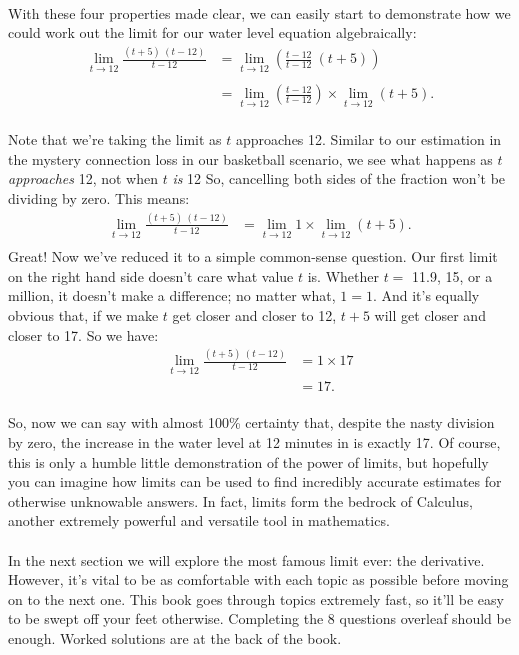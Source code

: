 \documentclass[11pt, leqno]{article}
\numberwithin{equation}{section}
\begin{document}
\\ With these four properties made clear, we can easily start to demonstrate how we could work out the limit for our water level equation algebraically:
\begin{align*}
	\lim_{t \to 12} \frac{(t + 5) \ (t - 12)}{t - 12} &= \lim_{t \to 12} \left( \frac{t - 12}{t - 12} \ (t + 5) \right) \\ \\
	&= \lim_{t \to 12} \left(\frac{t - 12}{t - 12}\right) \times \lim_{t \to 12} (t + 5).
\end{align*}
\\ Note that we're taking the limit as \(t\) approaches 12. Similar to our estimation in the mystery connection loss in our basketball scenario, we see what happens as \(t\) \textit{approaches} 12, not when \(t\) \textit{is} 12 So, cancelling both sides of the fraction won't be dividing by zero. This means:
\begin{align*}
\lim_{t \to 12} \frac{(t + 5) \ (t - 12)}{t - 12} &= \lim_{t \to 12} 1 \times \lim_{t \to 12} \left( t + 5 \right). \\
\end{align*}
Great! Now we've reduced it to a simple common-sense question. Our first limit on the right hand side doesn't care what value \(t\) is. Whether \(t = \) 11.9, 15, or a million, it doesn't make a difference; no matter what, \(1 = 1\). And it's equally obvious that, if we make \(t\) get closer and closer to 12, \(t + 5\) will get closer and closer to 17. So we have:
\begin{align*}
\lim_{t \to 12} \frac{(t + 5) \ (t - 12)}{t - 12} &= 1 \times 17 \\
&= 17.
\end{align*}
\\ So, now we can say with almost 100\% certainty that, despite the nasty division by zero, the increase in the water level at 12 minutes in is exactly 17. Of course, this is only a humble little demonstration of the power of limits, but hopefully you can imagine how limits can be used to find incredibly accurate estimates for otherwise unknowable answers. In fact, limits form the bedrock of Calculus, another extremely powerful and versatile tool in mathematics. 
\\ \\ In the next section we will explore the most famous limit ever: the derivative. However, it's vital to be as comfortable with each topic as possible before moving on to the next one. This book goes through topics extremely fast, so it'll be easy to be swept off your feet otherwise. Completing the 8 questions overleaf should be enough. Worked solutions are at the back of the book.
\end{document}
